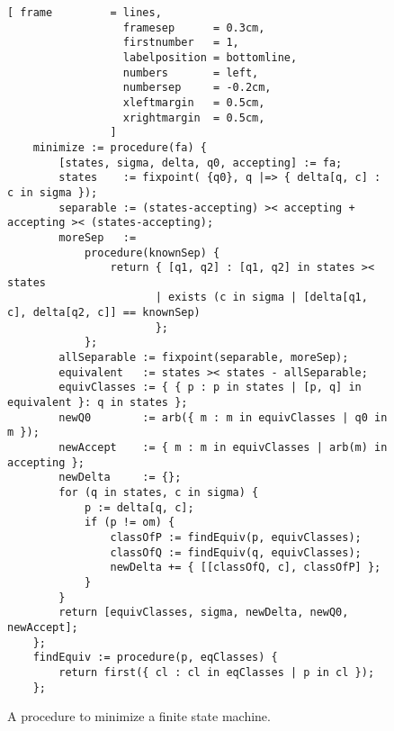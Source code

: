 \begin{figure}[!ht]
\centering
\begin{Verbatim}[ frame         = lines, 
                  framesep      = 0.3cm, 
                  firstnumber   = 1,
                  labelposition = bottomline,
                  numbers       = left,
                  numbersep     = -0.2cm,
                  xleftmargin   = 0.5cm,
                  xrightmargin  = 0.5cm,
                ]
    minimize := procedure(fa) {
        [states, sigma, delta, q0, accepting] := fa;
        states    := fixpoint( {q0}, q |=> { delta[q, c] : c in sigma });
        separable := (states-accepting) >< accepting + accepting >< (states-accepting);
        moreSep   := 
            procedure(knownSep) {
                return { [q1, q2] : [q1, q2] in states >< states
                       | exists (c in sigma | [delta[q1, c], delta[q2, c]] == knownSep)
                       };
            };
        allSeparable := fixpoint(separable, moreSep);
        equivalent   := states >< states - allSeparable;
        equivClasses := { { p : p in states | [p, q] in equivalent }: q in states };
        newQ0        := arb({ m : m in equivClasses | q0 in m });
        newAccept    := { m : m in equivClasses | arb(m) in accepting };   
        newDelta     := {};
        for (q in states, c in sigma) {
            p := delta[q, c];
            if (p != om) {
                classOfP := findEquiv(p, equivClasses);
                classOfQ := findEquiv(q, equivClasses);
                newDelta += { [[classOfQ, c], classOfP] };
            }
        }
        return [equivClasses, sigma, newDelta, newQ0, newAccept];
    };
    findEquiv := procedure(p, eqClasses) {
        return first({ cl : cl in eqClasses | p in cl });
    };
\end{Verbatim}
\vspace*{-0.3cm}
\caption{A procedure to minimize a finite state machine.}
\label{fig:minimize.stlx}
\end{figure}

